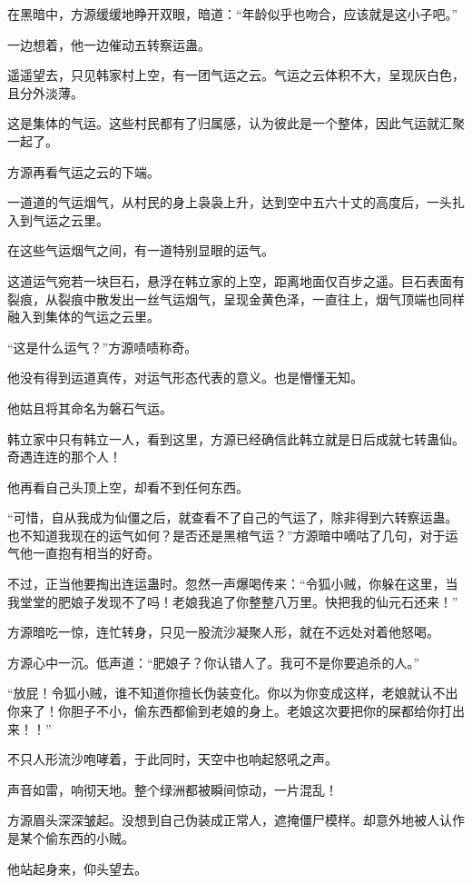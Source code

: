 \begin{this_body}
在黑暗中，方源缓缓地睁开双眼，暗道：“年龄似乎也吻合，应该就是这小子吧。”

一边想着，他一边催动五转察运蛊。

遥遥望去，只见韩家村上空，有一团气运之云。气运之云体积不大，呈现灰白色，且分外淡薄。

这是集体的气运。这些村民都有了归属感，认为彼此是一个整体，因此气运就汇聚一起了。

方源再看气运之云的下端。

一道道的气运烟气，从村民的身上袅袅上升，达到空中五六十丈的高度后，一头扎入到气运之云里。

在这些气运烟气之间，有一道特别显眼的运气。

这道运气宛若一块巨石，悬浮在韩立家的上空，距离地面仅百步之遥。巨石表面有裂痕，从裂痕中散发出一丝气运烟气，呈现金黄色泽，一直往上，烟气顶端也同样融入到集体的气运之云里。

“这是什么运气？”方源啧啧称奇。

他没有得到运道真传，对运气形态代表的意义。也是懵懂无知。

他姑且将其命名为磐石气运。

韩立家中只有韩立一人，看到这里，方源已经确信此韩立就是日后成就七转蛊仙。奇遇连连的那个人！

他再看自己头顶上空，却看不到任何东西。

“可惜，自从我成为仙僵之后，就查看不了自己的气运了，除非得到六转察运蛊。也不知道我现在的运气如何？是否还是黑棺气运？”方源暗中嘀咕了几句，对于运气他一直抱有相当的好奇。

不过，正当他要掏出连运蛊时。忽然一声爆喝传来：“令狐小贼，你躲在这里，当我堂堂的肥娘子发现不了吗！老娘我追了你整整八万里。快把我的仙元石还来！”

方源暗吃一惊，连忙转身，只见一股流沙凝聚人形，就在不远处对着他怒喝。

方源心中一沉。低声道：“肥娘子？你认错人了。我可不是你要追杀的人。”

“放屁！令狐小贼，谁不知道你擅长伪装变化。你以为你变成这样，老娘就认不出你来了！你胆子不小，偷东西都偷到老娘的身上。老娘这次要把你的屎都给你打出来！！”

不只人形流沙咆哮着，于此同时，天空中也响起怒吼之声。

声音如雷，响彻天地。整个绿洲都被瞬间惊动，一片混乱！

方源眉头深深皱起。没想到自己伪装成正常人，遮掩僵尸模样。却意外地被人认作是某个偷东西的小贼。

他站起身来，仰头望去。


\end{this_body}
